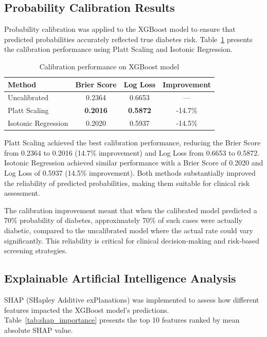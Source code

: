 \subsection{Probability Calibration Results}

Probability calibration was applied to the XGBoost model to ensure that predicted probabilities accurately reflected true diabetes risk. Table~\ref{tab:calibration_results} presents the calibration performance using Platt Scaling and Isotonic Regression.

\begin{table}[htbp]
\centering
\caption{Calibration performance on XGBoost model}
\label{tab:calibration_results}
\begin{tabular}{lccc}
\hline
\textbf{Method} & \textbf{Brier Score} & \textbf{Log Loss} & \textbf{Improvement} \\
\hline
Uncalibrated & 0.2364 & 0.6653 & --- \\
Platt Scaling & \textbf{0.2016} & \textbf{0.5872} & -14.7\% \\
Isotonic Regression & 0.2020 & 0.5937 & -14.5\% \\
\hline
\end{tabular}
\end{table}

Platt Scaling achieved the best calibration performance, reducing the Brier Score from 0.2364 to 0.2016 (14.7\% improvement) and Log Loss from 0.6653 to 0.5872. Isotonic Regression achieved similar performance with a Brier Score of 0.2020 and Log Loss of 0.5937 (14.5\% improvement). Both methods substantially improved the reliability of predicted probabilities, making them suitable for clinical risk assessment.

The calibration improvement meant that when the calibrated model predicted a 70\% probability of diabetes, approximately 70\% of such cases were actually diabetic, compared to the uncalibrated model where the actual rate could vary significantly. This reliability is critical for clinical decision-making and risk-based screening strategies.

\subsection{Explainable Artificial Intelligence Analysis}

SHAP (SHapley Additive exPlanations) was implemented to assess how different features impacted the XGBoost model's predictions. Table~\ref{tab:shap_importance} presents the top 10 features ranked by mean absolute SHAP value.

